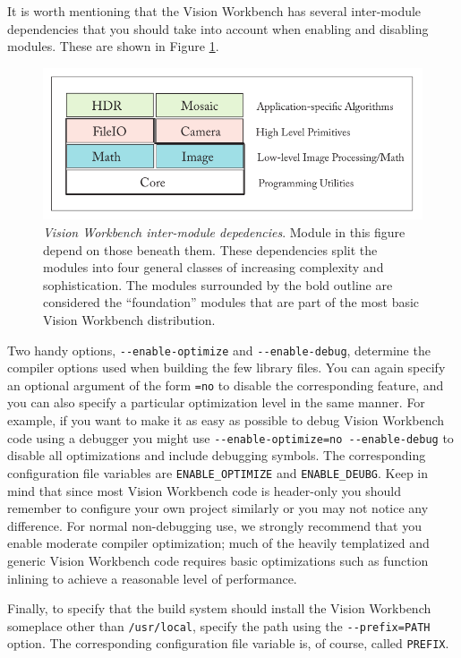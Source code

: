 It is worth mentioning that the Vision Workbench has several
inter-module dependencies that you should take into account when
enabling and disabling modules.  These are shown in Figure
\ref{fig:module-dependencies}.

\begin{figure}[t]
\begin{center}
  \includegraphics[width=6in]{images/module_dependencies.pdf}
 \end{center}
  \label{fig:module-dependencies}
  \caption{{\em Vision Workbench inter-module depedencies}.  Module in this
    figure depend on those beneath them.  These dependencies split the
    modules into four general classes of increasing complexity and
    sophistication.  The modules surrounded by the bold outline are
    considered the ``foundation'' modules that are part of the most
    basic Vision Workbench distribution.}
\end{figure}

Two handy options, \verb#--enable-optimize# and \verb#--enable-debug#,
determine the compiler options used when building the few library
files.  You can again specify an optional argument of the form
\verb#=no# to disable the corresponding feature, and you can also
specify a particular optimization level in the same manner.  For
example, if you want to make it as easy as possible to debug Vision
Workbench code using a debugger you might use
\verb#--enable-optimize=no --enable-debug# to disable all
optimizations and include debugging symbols.  The corresponding
configuration file variables are \verb#ENABLE_OPTIMIZE# and
\verb#ENABLE_DEUBG#.  Keep in mind that since most Vision Workbench
code is header-only you should remember to configure your own project
similarly or you may not notice any difference.  For normal
non-debugging use, we strongly recommend that you enable moderate
compiler optimization; much of the heavily templatized and generic
Vision Workbench code requires basic optimizations such as function
inlining to achieve a reasonable level of performance.

Finally, to specify that the build system should install the Vision Workbench 
someplace other than \verb#/usr/local#, specify the path using the 
\verb#--prefix=PATH# option.   The corresponding configuration file 
variable is, of course, called \verb#PREFIX#.
